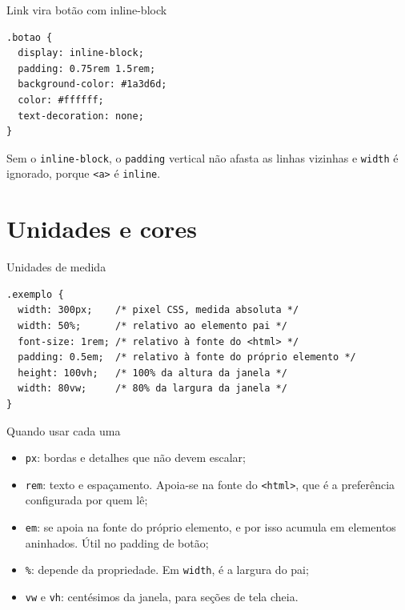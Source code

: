 \documentclass{beamer}
\begin{document}
\begin{frame}[fragile]{Link vira botão com inline-block}
	\begin{verbatim}
.botao {
  display: inline-block;
  padding: 0.75rem 1.5rem;
  background-color: #1a3d6d;
  color: #ffffff;
  text-decoration: none;
}
  \end{verbatim}

	\vspace{0.3cm}
	Sem o \texttt{inline-block}, o \texttt{padding} vertical não afasta as linhas
	vizinhas e \texttt{width} é ignorado, porque \texttt{<a>} é \texttt{inline}.
\end{frame}

\section{Unidades e cores}

\begin{frame}[fragile]{Unidades de medida}
	\begin{verbatim}
.exemplo {
  width: 300px;    /* pixel CSS, medida absoluta */
  width: 50%;      /* relativo ao elemento pai */
  font-size: 1rem; /* relativo à fonte do <html> */
  padding: 0.5em;  /* relativo à fonte do próprio elemento */
  height: 100vh;   /* 100% da altura da janela */
  width: 80vw;     /* 80% da largura da janela */
}
  \end{verbatim}
\end{frame}

\begin{frame}{Quando usar cada uma}
	\begin{itemize}
		\item \texttt{px}: bordas e detalhes que não devem escalar;
		\item \texttt{rem}: texto e espaçamento. Apoia-se na fonte do \texttt{<html>},
		      que é a preferência configurada por quem lê;
		\item \texttt{em}: se apoia na fonte do próprio elemento, e por isso acumula
		      em elementos aninhados. Útil no padding de botão;
		\item \texttt{\%}: depende da propriedade. Em \texttt{width}, é a largura do
		      pai;
		\item \texttt{vw} e \texttt{vh}: centésimos da janela, para seções de tela
		      cheia.
	\end{itemize}
\end{frame}
\end{document}
